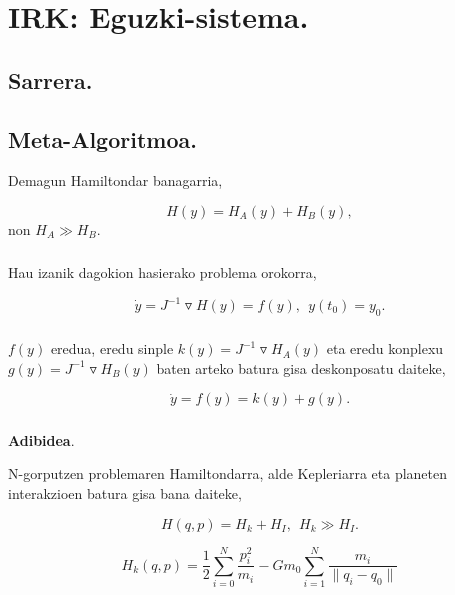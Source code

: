 \chapter{IRK: Eguzki-sistema.}

\section{Sarrera.}

\section{Meta-Algoritmoa.}

Demagun Hamiltondar banagarria,

\begin{equation*}
H(y)=H_A(y)+H_B(y),
\end{equation*}
non $H_A \gg H_B$. 

\paragraph*{}Hau izanik dagokion hasierako problema orokorra,

\begin{equation*}
\dot{y}=J^{-1}\triangledown H(y)=f(y) , \ \ y(t_0)=y_0.
\end{equation*}

\paragraph*{}$f(y)$ eredua, eredu sinple $k(y)=J^{-1}\triangledown H_A(y)$ eta eredu konplexu $g(y)=J^{-1}\triangledown H_B(y)$ baten arteko batura gisa deskonposatu daiteke,

\begin{equation*}
\dot{y}=f(y)=k(y)+g(y).
\end{equation*} 


\paragraph*{} \textbf{Adibidea}.

N-gorputzen problemaren Hamiltondarra, alde Kepleriarra eta planeten interakzioen batura gisa bana daiteke,

\begin{equation*}
H(q,p)=H_k+H_I, \ \ H_k \gg H_I.
\end{equation*}  

\begin{equation}
H_k(q,p)=\frac{1}{2} \sum\limits_{i=0}^{N} \frac{p_i^2}{m_i}- Gm_0 \sum\limits_{i=1}^{N} \frac{m_i}{\|q_i-q_0\|}
\end{equation}

